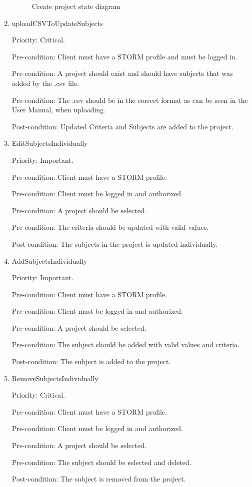 \begin{enumerate}
\begin{figure}[H]
    \caption{Create project state diagram}
\end{figure}
\item uploadCSVToUpdateSubjects\par
Priority: Critical.\par
Pre-condition: Client must have a STORM profile and must be logged in.\par
Pre-condition: A project should exist and should have subjects that was added by the .csv file.\par
Pre-condition: The .csv should be in the correct format as can be seen in the User Manual, when uploading.\par
Post-condition: Updated Criteria and Subjects are added to the project.\par

\item EditSubjectsIndividually\par
Priority: Important.\par
Pre-condition: Client must have a STORM profile.\par
Pre-condition: Client must be logged in and authorized.\par
Pre-condition: A project should be selected.\par
Pre-condition: The criteria should be updated with valid values.\par
Post-condition: The subjects in the project is updated individually.\par

\item AddSubjectsIndividually\par
Priority: Important.\par
Pre-condition: Client must have a STORM profile.\par
Pre-condition: Client must be logged in and authorized.\par
Pre-condition: A project should be selected.\par
Pre-condition: The subject should be added with valid values and criteria.\par
Post-condition: The subject is added to the project.\par

\item RemoveSubjectsIndividually\par
Priority: Critical.\par
Pre-condition: Client must have a STORM profile.\par
Pre-condition: Client must be logged in and authorized.\par
Pre-condition: A project should be selected.\par
Pre-condition: The subject should be selected and deleted.\par
Post-condition: The subject is removed from the project.\par


\end{enumerate}
